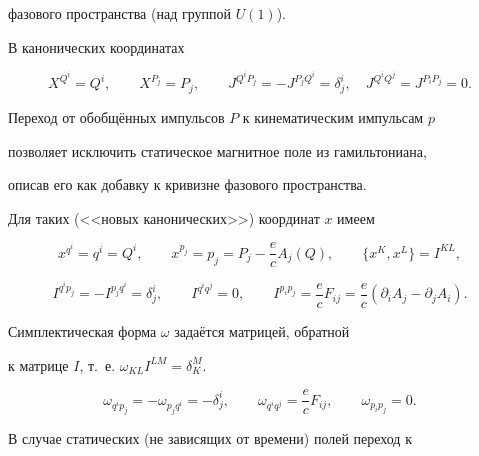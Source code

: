  фазового пространства (над группой $U(1)$).



  В канонических координатах

$$

  X^{Q^i}=Q^i,\qquad X^{P_j}=P_j,\qquad

  J^{Q^iP_j}=-J^{P_jQ^i}=\delta^i_j,\quad

  J^{Q^iQ^j}=J^{P_iP_j}=0.

$$

 Переход от обобщённых импульсов $P$ к кинематическим импульсам $p$

 позволяет исключить статическое магнитное поле из гамильтониана,

 описав его как добавку к кривизне фазового пространства.

   Для таких (<<новых канонических>>) координат $x$ имеем

\begin{equation}\label{x-ncanon}

  x^{q^i}=q^i=Q^i,\qquad

  x^{p_j}=p_j=P_j-\frac{e}cA_j(Q),\qquad

  \{x^K,x^L\}=I^{KL},

\end{equation}

\begin{equation}\label{I-ncanon}

  I^{q^ip_j}=-I^{p_jq^i}=\delta^i_j,\qquad

  I^{q^iq^j}=0,\qquad

  I^{p_ip_j}=\frac{e}c F_{ij}=\frac{e}c(\partial_i A_j-\partial_j A_i).

\end{equation}

 Симплектическая форма $\omega$ задаётся матрицей, обратной

 к матрице $I$, т.~е. $\omega_{KL}I^{LM}=\delta_K^M$.

\begin{equation}\label{s-form-ncanon}

  \omega_{q^ip_j}=-\omega_{p_jq^i}=-\delta^i_j,\qquad

  \omega_{q^iq^j}=\frac{e}c F_{ij},\qquad

  \omega_{p_ip_j}=0.

\end{equation}



  В случае статических (не зависящих от времени) полей переход к

